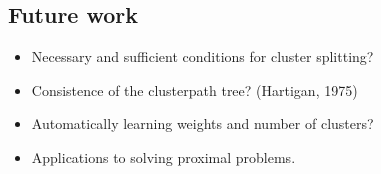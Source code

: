 \documentclass[]{posterDIGITEO}
\begin{document}
\begin{multicols}{2}
\section{Future work}
  \begin{itemize}
  \item Necessary and sufficient conditions for cluster splitting?
  \item Consistence of the clusterpath tree? (Hartigan, 1975)
  \item Automatically learning weights and number of clusters?
  \item Applications to solving proximal problems.
  \end{itemize}




\end{multicols}
\end{document}

